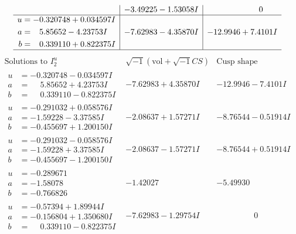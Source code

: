 \documentclass[1p]{elsarticle_modified}
\theoremstyle{definition}
\newcommand{\I}{\sqrt{-1}}
\begin{document}
$$\begin{array}{c|c|c}
 & -3.49225 - 1.53058 I & \phantom{-0.000000 } 0 \\ \hline\begin{aligned}
u &= -0.320748 + 0.034597 I \\
a &= \phantom{-}5.85652 - 4.23753 I \\
b &= \phantom{-}0.339110 + 0.822375 I\end{aligned}
 & -7.62983 - 4.35870 I & -12.9946 + 7.4101 I\\
 \hline 
 \end{array}$$\newpage$$\begin{array}{c|c|c}  
\text{Solutions to }I^u_{2}& \I (\text{vol} + \sqrt{-1}CS) & \text{Cusp shape}\\
 \hline 
\begin{aligned}
u &= -0.320748 - 0.034597 I \\
a &= \phantom{-}5.85652 + 4.23753 I \\
b &= \phantom{-}0.339110 - 0.822375 I\end{aligned}
 & -7.62983 + 4.35870 I & -12.9946 - 7.4101 I \\ \hline\begin{aligned}
u &= -0.291032 + 0.058576 I \\
a &= -1.59228 - 3.37585 I \\
b &= -0.455697 + 1.200150 I\end{aligned}
 & -2.08637 + 1.57271 I & -8.76544 - 0.51914 I \\ \hline\begin{aligned}
u &= -0.291032 - 0.058576 I \\
a &= -1.59228 + 3.37585 I \\
b &= -0.455697 - 1.200150 I\end{aligned}
 & -2.08637 - 1.57271 I & -8.76544 + 0.51914 I \\ \hline\begin{aligned}
u &= -0.289671\phantom{ +0.000000I} \\
a &= -1.58078\phantom{ +0.000000I} \\
b &= -0.766826\phantom{ +0.000000I}\end{aligned}
 & -1.42027\phantom{ +0.000000I} & -5.49930\phantom{ +0.000000I} \\ \hline\begin{aligned}
u &= -0.57394 + 1.89944 I \\
a &= -0.156804 + 1.350680 I \\
b &= \phantom{-}0.339110 - 0.822375 I\end{aligned}
 & -7.62983 - 1.29754 I & \phantom{-0.000000 } 0 \\ \hline\begin{aligned}

\end{aligned}
\end{array}$$
\end{document}
